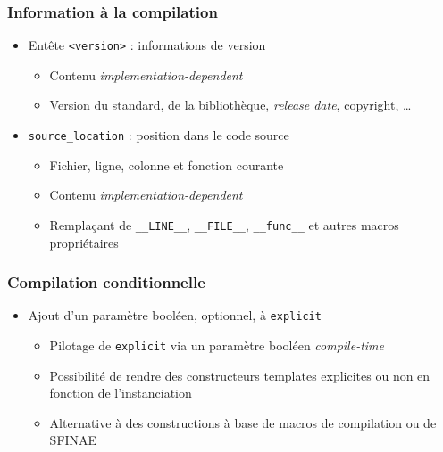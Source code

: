 \documentclass[C++.tex]{subfiles}
\begin{document}
\begin{frame}[fragile]
	\frametitle{Information à la compilation}
	\begin{itemize}
		\item Entête \lstinline|<version>| : informations de version
		\begin{itemize}
			\item Contenu \textit{implementation-dependent}
			\item Version du standard, de la bibliothèque, \textit{release date}, copyright, \ldots
		\end{itemize}
		
		\item \lstinline|source_location| : position dans le code source
		\begin{itemize}
			\item Fichier, ligne, colonne et fonction courante
			\item Contenu \textit{implementation-dependent}


			\item Remplaçant de \lstinline|__LINE__|, \lstinline|__FILE__|, \lstinline|__func__| et autres macros propriétaires
		\end{itemize}
	\end{itemize}
\end{frame}

\begin{frame}[fragile]
	\frametitle{Compilation conditionnelle}
	\begin{itemize}
		\item Ajout d'un paramètre booléen, optionnel, à \lstinline|explicit|
		\begin{itemize}
			\item Pilotage de \lstinline|explicit| via un paramètre booléen \textit{compile-time}
			\item Possibilité de rendre des constructeurs templates explicites ou non en fonction de l'instanciation
			\item Alternative à des constructions à base de macros de compilation ou de SFINAE
		\end{itemize}
	\end{itemize}
\end{frame}
\end{document}

